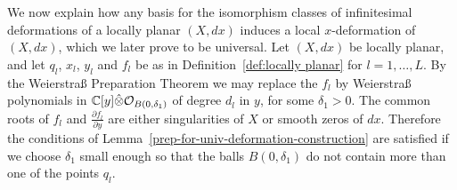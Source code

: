 \documentclass[11pt,twoside]{amsart}
\theoremstyle{plain}
\newcommand{\Tm}{\mathcal{T}}
\newcommand{\Sh}[1]{\mathcal{#1}} %
\newcommand{\dfx}{dx}
\begin{document}


We now explain how any basis for the isomorphism classes of infinitesimal deformations of a locally planar $(X,\dfx) $ induces a local $ x $-deformation of $ (X,\dfx)$, which we later prove to be universal. 
Let $(X,\dfx) $ be locally planar, and let $q_l$, $x_l$, $y_l$ and $f_l$ be as in Definition~\ref{def:locally planar} for $l=1,\ldots,L$.
 By the Weierstra{\ss} Preparation Theorem \cite[Chapter I Theorem 1.4]{PR:94} we may replace the $f_l$ by Weierstra{\ss} polynomials in $\mathbb{C}[y]\Hat{\otimes}\Sh{O}_{B(0,\delta_1)}$ of degree $d_l$ in $y$, for some $\delta_1>0$.
The common roots of $f_l$ and $\tfrac{\partial f_l}{\partial y}$ are either singularities of $X$ or smooth zeros of $\dfx$. Therefore the conditions of Lemma~\ref{prep-for-univ-deformation-construction} are satisfied if we choose $\delta_1$ small enough so that the balls $B(0,\delta_1)$ do not contain more than one of the points $q_l$. 
\end{document}
